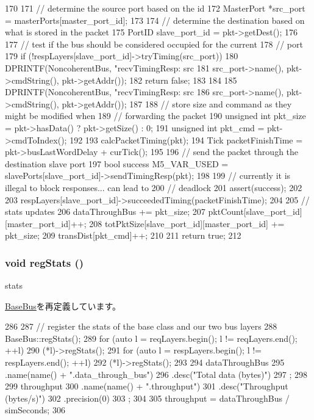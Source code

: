 \begin{DoxyCode}
170 {
171     // determine the source port based on the id
172     MasterPort *src_port = masterPorts[master_port_id];
173 
174     // determine the destination based on what is stored in the packet
175     PortID slave_port_id = pkt->getDest();
176 
177     // test if the bus should be considered occupied for the current
178     // port
179     if (!respLayers[slave_port_id]->tryTiming(src_port)) {
180         DPRINTF(NoncoherentBus, "recvTimingResp: src %
181                 src_port->name(), pkt->cmdString(), pkt->getAddr());
182         return false;
183     }
184 
185     DPRINTF(NoncoherentBus, "recvTimingResp: src %
186             src_port->name(), pkt->cmdString(), pkt->getAddr());
187 
188     // store size and command as they might be modified when
189     // forwarding the packet
190     unsigned int pkt_size = pkt->hasData() ? pkt->getSize() : 0;
191     unsigned int pkt_cmd = pkt->cmdToIndex();
192 
193     calcPacketTiming(pkt);
194     Tick packetFinishTime = pkt->busLastWordDelay + curTick();
195 
196     // send the packet through the destination slave port
197     bool success M5_VAR_USED = slavePorts[slave_port_id]->sendTimingResp(pkt);
198 
199     // currently it is illegal to block responses... can lead to
200     // deadlock
201     assert(success);
202 
203     respLayers[slave_port_id]->succeededTiming(packetFinishTime);
204 
205     // stats updates
206     dataThroughBus += pkt_size;
207     pktCount[slave_port_id][master_port_id]++;
208     totPktSize[slave_port_id][master_port_id] += pkt_size;
209     transDist[pkt_cmd]++;
210 
211     return true;
212 }
\end{DoxyCode}
\hypertarget{classNoncoherentBus_a4dc637449366fcdfc4e764cdf12d9b11}{
\subsubsection[{regStats}]{\setlength{\rightskip}{0pt plus 5cm}void regStats ()}}
\label{classNoncoherentBus_a4dc637449366fcdfc4e764cdf12d9b11}
stats 

\hyperlink{classBaseBus_a4dc637449366fcdfc4e764cdf12d9b11}{BaseBus}を再定義しています。


\begin{DoxyCode}
286 {
287     // register the stats of the base class and our two bus layers
288     BaseBus::regStats();
289     for (auto l = reqLayers.begin(); l != reqLayers.end(); ++l)
290         (*l)->regStats();
291     for (auto l = respLayers.begin(); l != respLayers.end(); ++l)
292         (*l)->regStats();
293 
294     dataThroughBus
295         .name(name() + ".data_through_bus")
296         .desc("Total data (bytes)")
297         ;
298 
299     throughput
300         .name(name() + ".throughput")
301         .desc("Throughput (bytes/s)")
302         .precision(0)
303         ;
304 
305     throughput = dataThroughBus / simSeconds;
306 }
\end{DoxyCode}



